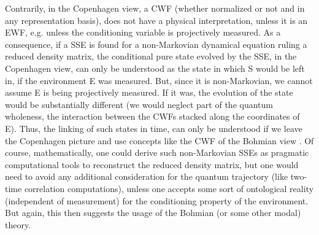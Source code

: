 \documentclass[11pt, a4paper]{article} %
\begin{document}
Contrarily, in the Copenhagen view, a CWF (whether normalized or not and in any representation basis), does not have a physical interpretation, unless it is an EWF, e.g. unless the conditioning variable is projectively measured. As a consequence, if a SSE is found for a non-Markovian dynamical equation ruling a reduced density matrix, the conditional pure state evolved by the SSE, in the Copenhagen view, can only be understood as the state in which S would be left in, if the environment E was measured. But, since it is non-Markovian, we cannot assume E is being projectively measured. If it was, the evolution of the state would be substantially different (we would neglect part of the quantum wholeness, the interaction between the CWFs stacked along the coordinates of E). Thus, the linking of such states in time, can only be understood if we leave the Copenhagen picture and use concepts like the CWF of the Bohmian view \cite{NMisModal, interpretSSE}. Of course, mathematically, one could derive such non-Markovian SSEs as pragmatic computational tools to reconstruct the reduced density matrix, but one would need to avoid any additional consideration for the quantum trajectory (like two-time correlation computations), unless one accepts some sort of ontological reality (independent of measurement) for the conditioning property of the environment. But again, this then suggests the usage of the Bohmian (or some other modal) theory.
\end{document}
